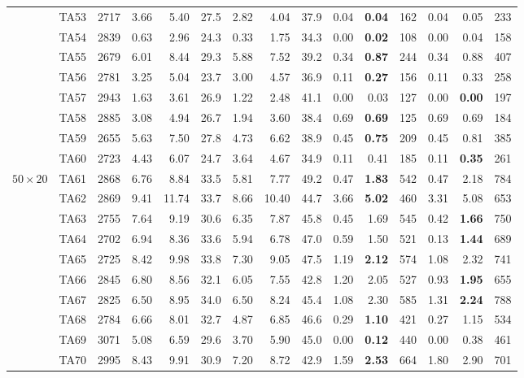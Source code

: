 \documentclass[a4paper,11pt]{article}
\begin{document}
\begin{table}[htbp]
\begin{tabular}{ll r | rr r | rr r | rr r | rr r}
 & TA53 & 2717 & 3.66 & 5.40 & 27.5 & 2.82 & 4.04 & 37.9 & 0.04 & \textbf{0.04} & 162 & 0.04 & 0.05 & 233 \\
 & TA54 & 2839 & 0.63 & 2.96 & 24.3 & 0.33 & 1.75 & 34.3 & 0.00 & \textbf{0.02} & 108 & 0.00 & 0.04 & 158 \\
 & TA55 & 2679 & 6.01 & 8.44 & 29.3 & 5.88 & 7.52 & 39.2 & 0.34 & \textbf{0.87} & 244 & 0.34 & 0.88 & 407 \\
 & TA56 & 2781 & 3.25 & 5.04 & 23.7 & 3.00 & 4.57 & 36.9 & 0.11 & \textbf{0.27} & 156 & 0.11 & 0.33 & 258 \\
 & TA57 & 2943 & 1.63 & 3.61 & 26.9 & 1.22 & 2.48 & 41.1 & 0.00 & 0.03 & 127 & 0.00 & \textbf{0.00} & 197 \\
 & TA58 & 2885 & 3.08 & 4.94 & 26.7 & 1.94 & 3.60 & 38.4 & 0.69 & \textbf{0.69} & 125 & 0.69 & 0.69 & 184 \\
 & TA59 & 2655 & 5.63 & 7.50 & 27.8 & 4.73 & 6.62 & 38.9 & 0.45 & \textbf{0.75} & 209 & 0.45 & 0.81 & 385 \\
 & TA60 & 2723 & 4.43 & 6.07 & 24.7 & 3.64 & 4.67 & 34.9 & 0.11 & 0.41 & 185 & 0.11 & \textbf{0.35} & 261 \\
\hline
$50\times20$ & TA61 & 2868 & 6.76 & 8.84 & 33.5 & 5.81 & 7.77 & 49.2 & 0.47 & \textbf{1.83} & 542 & 0.47 & 2.18 & 784 \\
 & TA62 & 2869 & 9.41 & 11.74 & 33.7 & 8.66 & 10.40 & 44.7 & 3.66 & \textbf{5.02} & 460 & 3.31 & 5.08 & 653 \\
 & TA63 & 2755 & 7.64 & 9.19 & 30.6 & 6.35 & 7.87 & 45.8 & 0.45 & 1.69 & 545 & 0.42 & \textbf{1.66} & 750 \\
 & TA64 & 2702 & 6.94 & 8.36 & 33.6 & 5.94 & 6.78 & 47.0 & 0.59 & 1.50 & 521 & 0.13 & \textbf{1.44} & 689 \\
 & TA65 & 2725 & 8.42 & 9.98 & 33.8 & 7.30 & 9.05 & 47.5 & 1.19 & \textbf{2.12} & 574 & 1.08 & 2.32 & 741 \\
 & TA66 & 2845 & 6.80 & 8.56 & 32.1 & 6.05 & 7.55 & 42.8 & 1.20 & 2.05 & 527 & 0.93 & \textbf{1.95} & 655 \\
 & TA67 & 2825 & 6.50 & 8.95 & 34.0 & 6.50 & 8.24 & 45.4 & 1.08 & 2.30 & 585 & 1.31 & \textbf{2.24} & 788 \\
 & TA68 & 2784 & 6.66 & 8.01 & 32.7 & 4.87 & 6.85 & 46.6 & 0.29 & \textbf{1.10} & 421 & 0.27 & 1.15 & 534 \\
 & TA69 & 3071 & 5.08 & 6.59 & 29.6 & 3.70 & 5.90 & 45.0 & 0.00 & \textbf{0.12} & 440 & 0.00 & 0.38 & 461 \\
 & TA70 & 2995 & 8.43 & 9.91 & 30.9 & 7.20 & 8.72 & 42.9 & 1.59 & \textbf{2.53} & 664 & 1.80 & 2.90 & 701 \\
\hline
\end{tabular}
\end{table}
\end{document}
